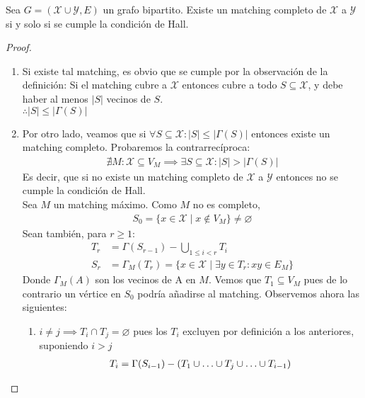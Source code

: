 \begin{theorem}
Sea $G = (\mathcal{X} \cup \mathcal{Y}, E)$ un grafo bipartito. Existe un matching completo de $\mathcal{X}$ a $\mathcal{Y}$ si y solo si se cumple la condición de Hall.
\end{theorem}
\begin{proof}
\begin{enumerate}
    \item Si existe tal matching, es obvio que se cumple por la observación de la definición: Si el matching cubre a $\mathcal{X}$ entonces cubre a todo $S\subseteq \mathcal{X}$, y debe haber al menos $\left| S \right|$ vecinos de $S$.\\
    $\therefore \left|S\right| \le \left|\Gamma(S)\right|$

    \item Por otro lado, veamos que si $\forall S \subseteq \mathcal{X}: \left|S\right| \le \left| \Gamma(S) \right|$ entonces existe un matching completo. Probaremos la contrarrecíproca:
    \begin{align}
        \nexists M : \mathcal{X} \subseteq V_M \implies \exists S \subseteq \mathcal{X} : \left|S\right| > \left|\Gamma(S)\right|
    \end{align}
    Es decir, que si no existe un matching completo de $\mathcal{X}$ a $\mathcal{Y}$ entonces no se cumple la condición de Hall.\\
    Sea $M$ un matching máximo. Como $M$ no es completo,
    \begin{align}
        S_0 = \{ x \in \mathcal{X} \mid x \notin V_M \} \neq \varnothing
    \end{align}
    Sean también, para $r \ge 1$:
    \begin{align}
        T_r &= \Gamma(S_{r-1}) - \bigcup \limits_{1 \le i < r} T_i\\
        S_r &= \Gamma_M(T_r) = \{ x \in \mathcal{X} \mid \exists y \in T_r : xy \in E_M \}
    \end{align}
    Donde $\Gamma_M(A)$ son los vecinos de A en $M$. Vemos que $T_1 \subseteq V_M$ pues de lo contrario un vértice en $S_0$ podría añadirse al matching.
    Observemos ahora las siguientes:
    \begin{enumerate}
        \item $i \neq j \implies T_i \cap T_j = \varnothing$ pues los $T_i$ excluyen por definición a los anteriores, suponiendo $i > j$
        \begin{align}
            T_i = \Gamma(S_{i-1}) - (T_1 \cup \mathellipsis \cup T_j \cup \mathellipsis \cup T_{i-1})

\end{align}
\end{enumerate}
\end{enumerate}
\end{proof}
